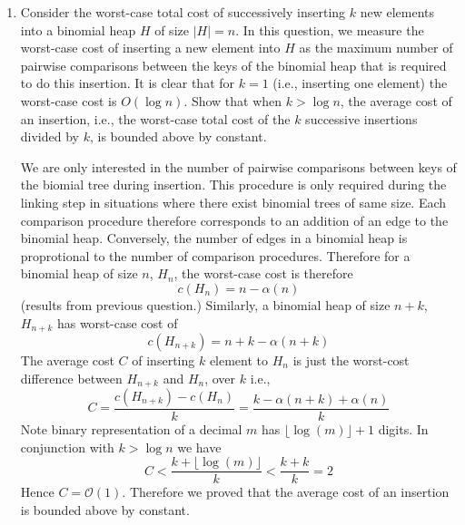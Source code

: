 \documentclass[11pt]{article}
\begin{document}
\begin{enumerate}
\begin{proof}
\begin{enumerate}
    \end{enumerate}
  \end{proof}

  \item Consider the worst-case total cost of successively inserting $k$ new elements into a binomial heap $H$ of size $|H| = n$. In this question, we measure the worst-case cost of inserting a new element into $H$ as the maximum number of pairwise comparisons between the keys of the binomial heap that is required to do this insertion. It is clear that for $k = 1$ (i.e., inserting one element) the worst-case cost is $O(\log n)$. Show that when $k > \log n$, the average cost of an insertion, i.e., the worst-case total cost of the $k$ successive insertions divided by $k$, is bounded above by constant.

  \begin{solution}
    We are only interested in the number of pairwise comparisons between keys of the biomial tree during insertion. This procedure is only required during the linking step in situations where there exist binomial trees of same size. Each comparison procedure therefore corresponds to an addition of an edge to the binomial heap. Conversely, the number of edges in a binomial heap is proprotional to the number of comparison procedures. Therefore for a binomial heap of size $n$, $H_n$, the worst-case cost is therefore
    \[
      c(H_n) = n- \alpha(n)
    \]
    (results from previous question.) Similarly, a binomial heap of size $n+k$, $H_{n+k}$ has worst-case cost of
    \[
      c(H_{n+k}) = n+ k -\alpha(n+k)
    \]
    The average cost $C$ of inserting $k$ element to $H_n$ is just the worst-cost difference between $H_{n+k}$ and $H_{n}$, over $k$ i.e.,
    \[
      C = \frac{c(H_{n+k}) - c(H_{n})}{k} = \frac{k - \alpha(n+k) + \alpha(n)}{k}
    \]
    Note binary representation of a decimal  $m$ has $\lfloor \log (m) \rfloor + 1$ digits. In conjunction with $k > \log n$ we have
    \[
      C < \frac{k + \lfloor \log (m) \rfloor}{k} < \frac{k + k}{k} = 2
    \]
    Hence $C = \mathcal{O}(1)$. Therefore we proved that the average cost of an insertion is bounded above by constant.
  \end{solution}

\end{enumerate}
\end{document}
